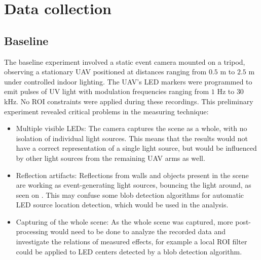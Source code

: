 \section{Data collection}

\subsection{Baseline}

The baseline experiment involved a static event camera mounted on a tripod, observing a stationary \ac{UAV} positioned at distances ranging from
$0.5$ m to $2.5$ m under controlled indoor lighting. The \ac{UAV}'s \ac{LED} markers were programmed to emit pulses of \ac{UV} light with modulation
frequencies ranging from $1$ Hz to $30$ kHz. No \ac{ROI} constraints were applied during these recordings.
This preliminary experiment revealed critical problems in the measuring technique:
\begin{itemize}
    \item Multiple visible \ac{LED}s: The camera captures the scene as a whole, with no isolation of individual light sources. This means that the results
    would not have a correct representation of a single light source, but would be influenced by other light sources from the remaining \ac{UAV}
    arms as well.
    \item Reflection artifacts: Reflections from walls and objects present in the scene are working as event-generating light sources, bouncing the light around,
    as seen on .
    This may confuse some blob detection algorithms for automatic \ac{LED} source location detection, which would be used in the analysis.
    \item Capturing of the whole scene: As the whole scene was captured, more post-processing would need to be done to analyze the recorded data and investigate
    the relations of measured effects, for example a local \ac{ROI} filter could be applied to \ac{LED} centers detected by
    a blob detection algorithm.
\end{itemize}


